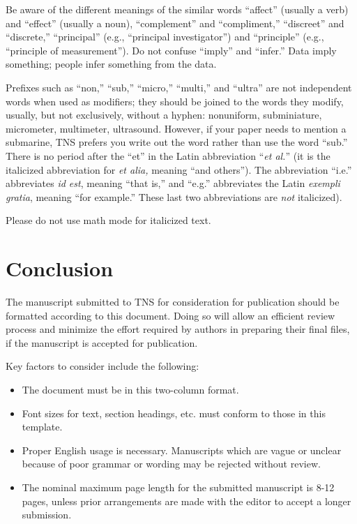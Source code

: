 \documentclass{IEEEtran}
\begin{document}
Be aware of the different meanings of the similar words ``affect'' (usually
a verb) and ``effect'' (usually a noun), ``complement'' and ``compliment,''
``discreet'' and ``discrete,'' ``principal'' (e.g., ``principal
investigator'') and ``principle'' (e.g., ``principle of measurement''). Do
not confuse ``imply'' and ``infer.'' Data imply something; people infer
something from the data.

Prefixes such as ``non,'' ``sub,'' ``micro,'' ``multi,'' and ``ultra'' are
not independent words when used as modifiers; they should be joined to the
words they modify, usually, but not exclusively, without a hyphen:
nonuniform, subminiature, micrometer, multimeter, ultrasound. However, if
your paper needs to mention a submarine, TNS prefers you write out the word
rather than use the word ``sub.'' There is no period after the ``et'' in the
Latin abbreviation ``\textit{et al.}'' (it is the italicized abbreviation for \textit{et alia,} meaning
``and others''). The abbreviation ``i.e.'' abbreviates \textit{id est}, meaning ``that
is,'' and ``e.g.'' abbreviates the Latin \textit{exempli gratia}, meaning ``for example.'' These
last two abbreviations are \textit{not} italicized).

Please do not use math mode for italicized text.

\section{Conclusion}
The manuscript submitted to TNS for consideration for publication should be
formatted according to this document. Doing so will allow an efficient
review process and minimize the effort required by authors in preparing
their final files, if the manuscript is accepted for publication.

Key factors to consider include the following:

\begin{itemize}
\item The document must be in this two-column format.
\item Font sizes for text, section headings, etc. must conform to those in this template.
\item Proper English usage is necessary. Manuscripts which are vague or unclear because of poor grammar or wording may be rejected without review.
\item The nominal maximum page length for the submitted manuscript is 8-12 pages, unless prior arrangements are made with the editor to accept a longer submission.
\end{itemize}
\end{document}
